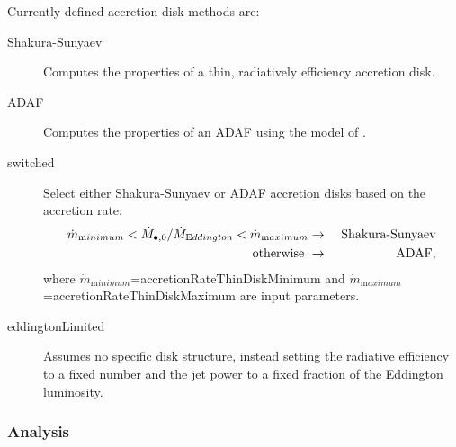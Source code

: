 Currently defined accretion disk methods are:
\begin{description}
 \item [{\normalfont \ttfamily Shakura-Sunyaev}] Computes the properties of a thin, radiatively efficiency accretion disk.
 \item [{\normalfont \ttfamily ADAF}] Computes the properties of an ADAF using the model of \cite{benson_maximum_2009}.
 \item [{\normalfont \ttfamily switched}] Select either {\normalfont \ttfamily Shakura-Sunyaev} or {\normalfont \ttfamily ADAF} accretion disks based on the accretion rate:
 \begin{eqnarray}
  \dot{m}_{\mathrm minimum} < \dot{M}_{\bullet, 0}/\dot{M}_{\mathrm Eddington} < \dot{m}_{\mathrm maximum} &\rightarrow& \hbox{ Shakura-Sunyaev} \nonumber \\
  \hbox{otherwise } &\rightarrow& \hbox{ ADAF},
 \end{eqnarray}
 where $\dot{m}_{\mathrm minimum}$={\normalfont \ttfamily accretionRateThinDiskMinimum} and $\dot{m}_{\mathrm maximum}$={\normalfont \ttfamily accretionRateThinDiskMaximum} are input parameters.
 \item [{\normalfont \ttfamily eddingtonLimited}] Assumes no specific disk structure, instead setting the radiative efficiency to a fixed number and the jet power to a fixed fraction of the Eddington luminosity.
\end{description}

\subsubsection{Analysis}

